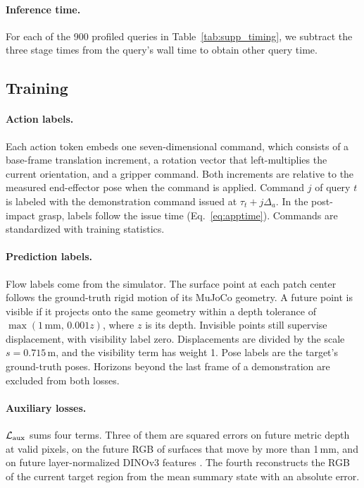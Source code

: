\paragraph{Inference time.}
\label{app:latency_results}
For each of the 900 profiled queries in Table~\ref{tab:supp_timing}, we subtract the three stage times from the query's wall time to obtain other query time.

\begin{table}[!htb]
\centering\footnotesize

\end{table}

\subsection{Training}
\label{app:training}
\paragraph{Action labels.}
Each action token embeds one seven-dimensional command, which consists of a
base-frame translation increment, a rotation vector that left-multiplies the current
orientation, and a gripper command. Both increments are relative to the measured
end-effector pose when the command is applied. Command $j$ of query $t$ is labeled with
the demonstration command issued at $\tau_t+j\Delta_a$. In the post-impact grasp, labels follow the issue time (Eq.~\eqref{eq:apptime}). Commands are
standardized with training statistics.

\paragraph{Prediction labels.}
Flow labels come from the simulator. The surface point at each patch center
follows the ground-truth rigid motion of its MuJoCo geometry. A future point is visible
if it projects onto the same geometry within a depth tolerance of
$\max(1\,\mathrm{mm},\,0.001z)$, where $z$ is its depth. Invisible points still supervise displacement, with visibility label zero. Displacements are divided
by the scale $s=0.715$\,m, and the visibility term has weight 1. Pose labels are the target's ground-truth poses. Horizons beyond the last frame of a demonstration are
excluded from both losses.

\paragraph{Auxiliary losses.}
$\mathcal L_{\rm aux}$ sums four terms. Three of them are squared errors on future
metric depth at valid pixels, on the future RGB of surfaces that move by more than
1\,mm, and on future layer-normalized DINOv3 features \cite{dinov3}.
The fourth reconstructs the RGB of the current target region from the mean summary
state with an absolute error.

